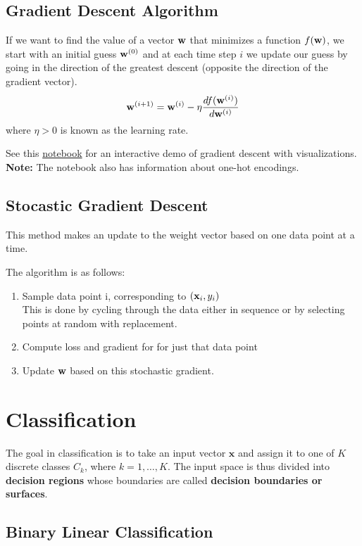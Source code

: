 \documentclass[12pt,letterpaper]{article}
\begin{document}
\subsection{Gradient Descent Algorithm}
If we want to find the value of a vector $\mathbf{w}$ that minimizes a function $f(\mathbf{w})$, we start with an initial guess $\mathbf{w}^{(0)}$ and at each time step $i$ we update our guess by going in the direction of the greatest descent (opposite the direction of the gradient vector).
\begin{align}
\mathbf{w}^{(i+1)} = \mathbf{w}^{(i)} - \eta \frac{d f(\mathbf{w}^{(i)})}{d\mathbf{w}^{(i)}}\end{align}
where $\eta > 0$ is known as the learning rate.

See this \href{https://colab.research.google.com/drive/1AJRaGeqgTosVNWjinYPahB1RHGAOwIh-}{notebook} for an interactive demo of gradient descent with visualizations. \\
\textbf{Note: } The notebook also has information about one-hot encodings.

\subsection{Stocastic Gradient Descent}
This method makes an update to the weight vector based on one data point at a time. 

The algorithm is as follows:
\begin{enumerate}
    \item Sample data point i, corresponding to $(\mathbf{x}_i,y_i)$\\
    This is done by cycling through the data either in sequence or by selecting points at random with replacement.
    \item Compute loss and gradient for for just that data point
    \item Update $\mathbf{w}$ based on this stochastic gradient.
\end{enumerate}

\section{Classification}
The goal in classification is to take an input vector $\mathbf{x}$ and assign it to one of $K$ discrete classes $C_k$, where $k = 1, \hdots, K$.
The input space is thus divided into \textbf{decision regions} whose boundaries are called \textbf{decision boundaries or surfaces}.

\subsection{Binary Linear Classification}
\end{document}
